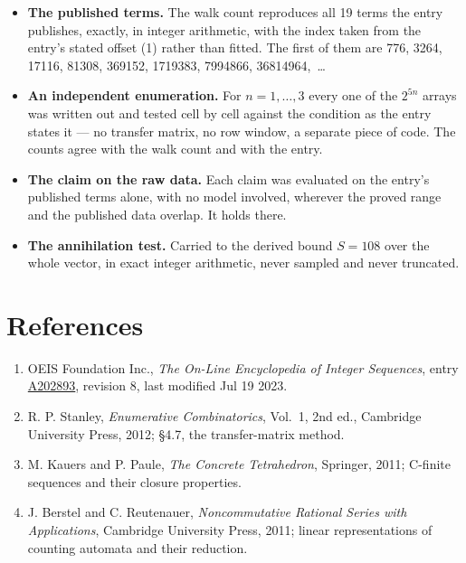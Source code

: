 \documentclass[11pt]{article}
\theoremstyle{definition}
\begin{document}
\begin{itemize}

\item {\bfseries The published terms.} The walk count reproduces all 19 terms the entry publishes, exactly, in integer arithmetic, with the index taken from the entry's stated offset (1) rather than fitted. The first of them are 776, 3264, 17116, 81308, 369152, 1719383, 7994866, 36814964,~\dots

\item {\bfseries An independent enumeration.} For $n = 1,\dots,3$ every one of the $2^{5n}$ arrays was written out and tested cell by cell against the condition as the entry states it --- no transfer matrix, no row window, a separate piece of code. The counts agree with the walk count and with the entry.

\item {\bfseries The claim on the raw data.} Each claim was evaluated on the entry's published terms alone, with no model involved, wherever the proved range and the published data overlap. It holds there.

\item {\bfseries The annihilation test.} Carried to the derived bound $S = 108$ over the whole vector, in exact integer arithmetic, never sampled and never truncated.

\end{itemize}

\section{References}

\begin{enumerate}

\item OEIS Foundation Inc., \emph{The On-Line Encyclopedia of Integer Sequences}, entry \href{https://oeis.org/A202893}{A202893}, revision 8, last modified Jul 19 2023.

\item R. P. Stanley, \emph{Enumerative Combinatorics}, Vol.~1, 2nd ed., Cambridge University Press, 2012; \S4.7, the transfer-matrix method.

\item M. Kauers and P. Paule, \emph{The Concrete Tetrahedron}, Springer, 2011; C-finite sequences and their closure properties.

\item J. Berstel and C. Reutenauer, \emph{Noncommutative Rational Series with Applications}, Cambridge University Press, 2011; linear representations of counting automata and their reduction.

\end{enumerate}
\end{document}
